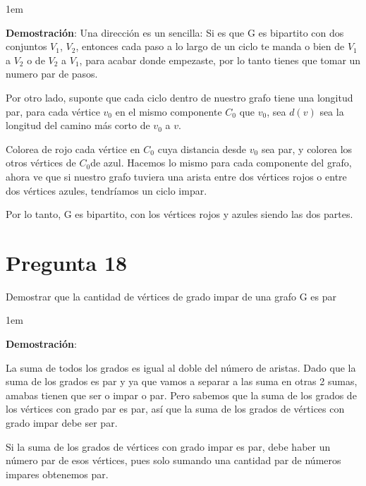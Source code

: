 \documentclass[12pt, fleqn]{article}                            %
\newenvironment{SmallIndentation}[1][0.75em]                    %
        {\begin{adjustwidth}{#1}{}\begin{footnotesize}}             %
        {\end{footnotesize}\end{adjustwidth}}                       %
\theoremstyle{break}                                            %
\begin{document}
        \begin{SmallIndentation}[1em]
            \textbf{Demostración}:
                Una dirección es un sencilla:
                Si es que G es bipartito con dos conjuntos $V_1$, $V_2$, entonces cada paso a lo largo de un ciclo te manda o bien de 
                $V_1$ a $V_2$ o de $V_2$ a $V_1$, para acabar donde empezaste, por lo tanto tienes que tomar un numero par de pasos.

                Por otro lado, suponte que cada ciclo dentro de nuestro grafo tiene una longitud par, para cada vértice $v_0$ en el
                mismo componente $C_0$ que $v_0$, sea $d(v)$ sea la longitud del camino más corto de $v_0$ a $v$.
                
                Colorea de rojo cada vértice en $C_0$ cuya distancia desde $v_0$ sea par, y colorea los otros vértices de $C_0$de azul. 
                Hacemos lo mismo para cada componente del grafo, ahora ve que si nuestro grafo tuviera una arista entre dos
                vértices rojos o entre dos vértices azules, tendríamos un ciclo impar.
                
                Por lo tanto, G es bipartito, con los vértices rojos y azules siendo las dos partes.
            
        \end{SmallIndentation}


    \clearpage
    \section{Pregunta 18}

        Demostrar que la cantidad de vértices de grado impar de una grafo G es
        par

        \begin{SmallIndentation}[1em]
            \textbf{Demostración}:

                La suma de todos los grados es igual al doble del número de aristas.
                Dado que la suma de los grados es par y ya que vamos a separar a las suma en otras 2 sumas, amabas tienen que ser o impar o par.
                Pero sabemos que la suma de los grados de los vértices con grado par es par, así que 
                la suma de los grados de vértices con grado impar debe ser par.
                
                Si la suma de los grados de vértices con grado impar es par, debe haber un número par de esos vértices, pues solo sumando
                una cantidad par de números impares obtenemos par.
            
        \end{SmallIndentation}
\end{document}

